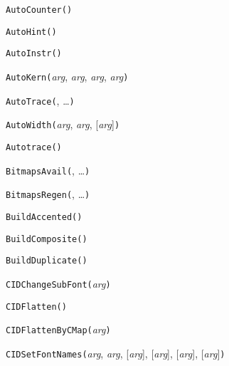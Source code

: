\noindent\texttt{AutoCounter(}\texttt{)}


\noindent\texttt{AutoHint(}\texttt{)}


\noindent\texttt{AutoInstr(}\texttt{)}


\noindent\texttt{AutoKern(}\textit{arg}, \textit{arg}, \textit{arg}, \textit{arg}\texttt{)}


\noindent\texttt{AutoTrace(}, \ldots\texttt{)}


\noindent\texttt{AutoWidth(}\textit{arg}, \textit{arg}, [\textit{arg}]\texttt{)}


\noindent\texttt{Autotrace(}\texttt{)}


\noindent\texttt{BitmapsAvail(}, \ldots\texttt{)}


\noindent\texttt{BitmapsRegen(}, \ldots\texttt{)}


\noindent\texttt{BuildAccented(}\texttt{)}


\noindent\texttt{BuildComposite(}\texttt{)}


\noindent\texttt{BuildDuplicate(}\texttt{)}


\noindent\texttt{CIDChangeSubFont(}\textit{arg}\texttt{)}


\noindent\texttt{CIDFlatten(}\texttt{)}


\noindent\texttt{CIDFlattenByCMap(}\textit{arg}\texttt{)}


\noindent\texttt{CIDSetFontNames(}\textit{arg}, \textit{arg}, [\textit{arg}], [\textit{arg}], [\textit{arg}], [\textit{arg}]\texttt{)}



